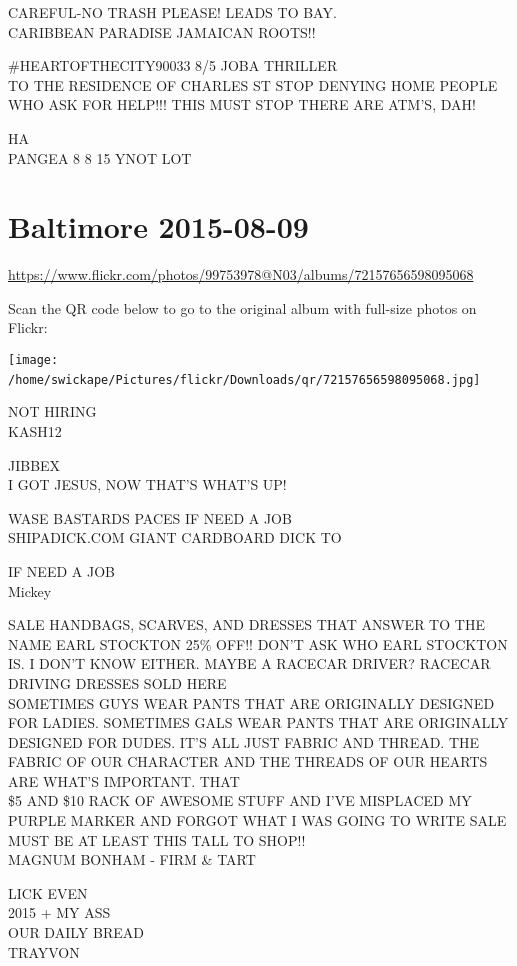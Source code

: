 \documentclass[10pt,letterpaper]{article}
\begin{document}
CAREFUL{-}NO TRASH PLEASE! LEADS TO BAY.\\
CARIBBEAN PARADISE JAMAICAN ROOTS!!

\#HEARTOFTHECITY90033 8/5 JOBA THRILLER\\
TO THE RESIDENCE OF CHARLES ST STOP DENYING HOME PEOPLE WHO ASK FOR HELP!!!  THIS MUST STOP THERE ARE ATM'S, DAH!

HA\\
PANGEA 8 8 15 YNOT LOT
\

\section*{Baltimore 2015-08-09}

\url{https://www.flickr.com/photos/99753978@N03/albums/72157656598095068}

Scan the QR code below to go to the original album with full-size photos on Flickr:

\texttt{[image: /home/swickape/Pictures/flickr/Downloads/qr/72157656598095068.jpg]}
\

NOT HIRING\\
KASH12

JIBBEX\\
I GOT JESUS, NOW THAT'S WHAT'S UP!

WASE BASTARDS PACES IF NEED A JOB\\
SHIPADICK.COM GIANT CARDBOARD DICK TO

IF NEED A JOB\\
Mickey

SALE HANDBAGS, SCARVES, AND DRESSES THAT ANSWER TO THE NAME EARL STOCKTON 25\% OFF!!  DON'T ASK WHO EARL STOCKTON IS.  I DON'T KNOW EITHER.  MAYBE A RACECAR DRIVER?  RACECAR DRIVING DRESSES SOLD HERE\\
SOMETIMES GUYS WEAR PANTS THAT ARE ORIGINALLY DESIGNED FOR LADIES.  SOMETIMES GALS WEAR PANTS THAT ARE ORIGINALLY DESIGNED FOR DUDES.  IT'S ALL JUST FABRIC AND THREAD.  THE FABRIC OF OUR CHARACTER AND THE THREADS OF OUR HEARTS ARE WHAT'S IMPORTANT.  THAT\\
\$5 AND \$10 RACK OF AWESOME STUFF AND I'VE MISPLACED MY PURPLE MARKER AND FORGOT WHAT I WAS GOING TO WRITE SALE MUST BE AT LEAST THIS TALL TO SHOP!!\\
MAGNUM BONHAM {-} FIRM \& TART

LICK EVEN\\
2015 + MY ASS\\
OUR DAILY BREAD\\
TRAYVON
\end{document}
